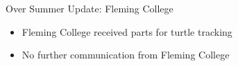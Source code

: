 




\begin{frame}{Over Summer Update: Fleming College}
    \begin{itemize}
        \item Fleming College received parts for turtle tracking
        \item No further communication from Fleming College
    \end{itemize}
\end{frame}

